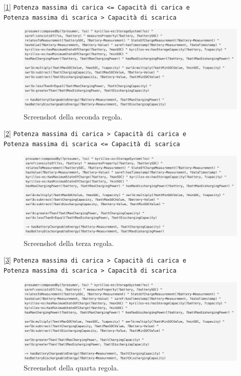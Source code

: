[\ref*{fig:charginglessorequal}] \texttt{Potenza massima di carica <= Capacità di carica e\\ Potenza massima di scarica > Capacità di scarica}

\begin{figure}[H]
    \centering
    \includegraphics[width=15cm]{images/charging <=.png}
    \caption{Screenshot della seconda regola.}
    \label{fig:charginglessorequal}
\end{figure}

[\ref*{fig:charginggreater}] \texttt{Potenza massima di carica > Capacità di carica e\\ Potenza massima di scarica <= Capacità di scarica}

\begin{figure}[H]
    \centering
    \includegraphics[width=15cm]{images/charging >.png}
    \caption{Screenshot della terza regola.}
    \label{fig:charginggreater}
\end{figure}

[\ref*{fig:bothgreater}] \texttt{Potenza massima di carica > Capacità di carica e\\ Potenza massima di scarica > Capacità di scarica}

\begin{figure}[H]
    \centering
    \includegraphics[width=15cm]{images/both >.png}
    \caption{Screenshot della quarta regola.}
    \label{fig:bothgreater}
\end{figure}

